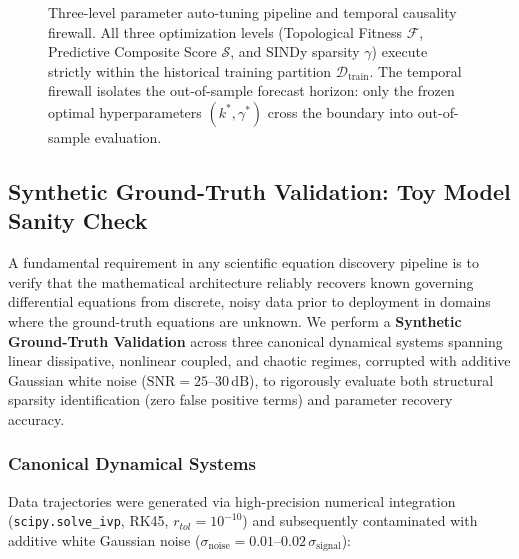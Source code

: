 \documentclass[11pt,a4paper]{article}
\begin{document}
\begin{figure}[H]
\caption{Three-level parameter auto-tuning pipeline and temporal causality firewall. All three optimization levels (Topological Fitness $\mathcal{F}$, Predictive Composite Score $\mathcal{S}$, and SINDy sparsity $\gamma$) execute strictly within the historical training partition $\mathcal{D}_{\text{train}}$. The temporal firewall isolates the out-of-sample forecast horizon: only the frozen optimal hyperparameters $(k^*, \gamma^*)$ cross the boundary into out-of-sample evaluation.}
\label{fig:calibration_flow}
\end{figure}



\subsection{Synthetic Ground-Truth Validation: Toy Model Sanity Check}
\label{sec:toy_model_validation}

A fundamental requirement in any scientific equation discovery pipeline is to verify that the mathematical architecture reliably recovers known governing differential equations from discrete, noisy data prior to deployment in domains where the ground-truth equations are unknown. We perform a \textbf{Synthetic Ground-Truth Validation} across three canonical dynamical systems spanning linear dissipative, nonlinear coupled, and chaotic regimes, corrupted with additive Gaussian white noise ($\text{SNR} = 25$--$30\,\text{dB}$), to rigorously evaluate both structural sparsity identification (zero false positive terms) and parameter recovery accuracy.

\subsubsection{Canonical Dynamical Systems}

Data trajectories were generated via high-precision numerical integration (\texttt{scipy.solve\_ivp}, RK45, $r_{tol} = 10^{-10}$) and subsequently contaminated with additive white Gaussian noise ($\sigma_{\text{noise}} = 0.01$--$0.02\,\sigma_{\text{signal}}$):
\end{document}
